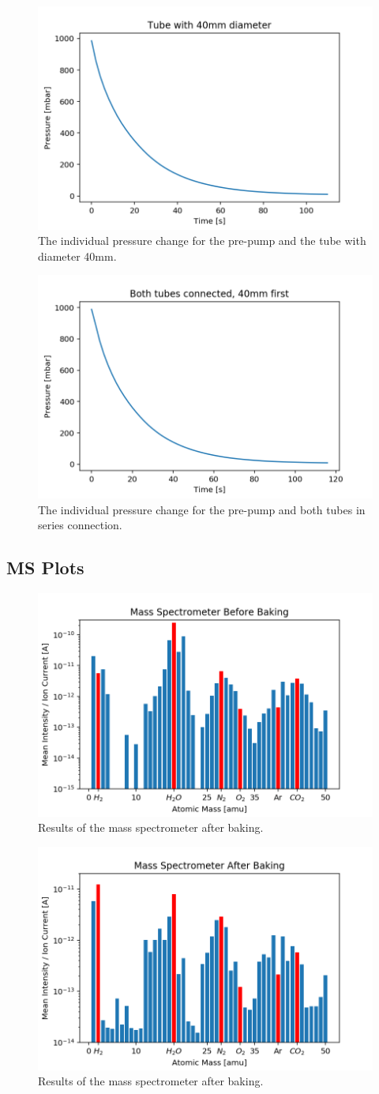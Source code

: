 \documentclass[]{article}
\begin{document}
\begin{figure}[!h]
\centering\includegraphics[width=.5\textwidth]{Plots/40mm.png}
\caption{The individual pressure change for the pre-pump and the tube with diameter 40mm.}
\label{fig::40mm}
\end{figure}

\begin{figure}[!h]
\centering\includegraphics[width=.5\textwidth]{Plots/BothTubes.png}
\caption{The individual pressure change for the pre-pump and both tubes in series connection.}
\label{fig::BothTubes}
\end{figure}


\subsection{MS Plots}
\label{MS Plots}

\begin{figure}[!h]
\centering\includegraphics[width=.5\textwidth]{Plots/MSbefore.png}
\caption{Results of the mass spectrometer after baking.}
\label{fig::MSbefore}
\end{figure}

\begin{figure}[!h]
\centering\includegraphics[width=.5\textwidth]{Plots/MSafter.png}
\caption{Results of the mass spectrometer after baking.}
\label{fig::MSafter}
\end{figure}
\end{document}
